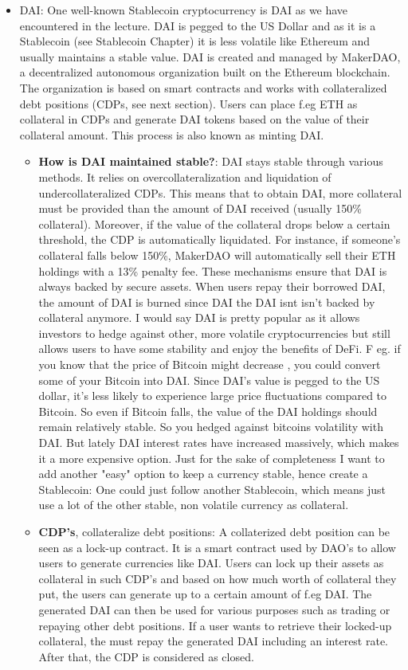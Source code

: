 \documentclass{article}
\begin{document}
\begin{itemize}
\item {DAI}: One well-known Stablecoin cryptocurrency is DAI as we have encountered in the lecture. DAI is pegged to the US Dollar and as it is a Stablecoin (see Stablecoin Chapter) it is less volatile like Ethereum and usually maintains a stable value. DAI is created and managed by MakerDAO, a decentralized autonomous organization built on the Ethereum blockchain. The organization is based on smart contracts and works with collateralized debt positions (CDPs, see next section). Users can place f.eg ETH as collateral in CDPs and generate DAI tokens based on the value of their collateral amount. This process is also known as minting DAI.
\begin{itemize}
\item \textbf{How is DAI maintained stable?}: DAI stays stable through various methods. It relies on overcollateralization and liquidation of undercollateralized CDPs. This means that to obtain DAI, more collateral must be provided than the amount of DAI received (usually 150\% collateral). Moreover, if the value of the collateral drops below a certain threshold, the CDP is automatically liquidated. For instance, if someone's collateral falls below 150\%, MakerDAO will automatically sell their ETH holdings with a 13\% penalty fee. These mechanisms ensure that DAI is always backed by secure assets. When users repay their borrowed DAI, the amount of DAI is burned since DAI the DAI isnt isn't backed by collateral anymore. I would say DAI is pretty popular as it allows investors to hedge against other, more volatile cryptocurrencies but still allows users to have some stability and enjoy the benefits of DeFi. F eg. if you know that the price of Bitcoin might decrease , you could convert some of your Bitcoin into DAI. Since DAI's value is pegged to the US dollar, it's less likely to experience large price fluctuations compared to Bitcoin. So even if Bitcoin falls, the value of the DAI holdings should remain relatively stable. So you hedged against bitcoins volatility with DAI. But lately DAI interest rates have increased massively, which makes it a more expensive option.
Just for the sake of completeness I want to add another "easy" option to keep a currency stable, hence create a Stablecoin: One could just follow another Stablecoin, which means just use a lot of the other stable, non volatile currency as collateral.
\end{itemize}
\begin{itemize}
\item {\textbf{CDP's}, collateralize debt positions}: A collaterized debt position can be seen as a lock-up contract. It is a smart contract used by DAO's to  allow users to generate currencies like DAI. Users can lock up their assets as collateral in such CDP's and based on how much worth of collateral they put, the users can generate up to a certain amount of f.eg DAI. The generated DAI can then be used for various purposes such as trading or repaying other debt positions. If a user wants to retrieve their locked-up collateral, the must repay the generated DAI including an interest rate. After that, the CDP is considered as closed.
\end{itemize}
\end{itemize}
\end{document}
